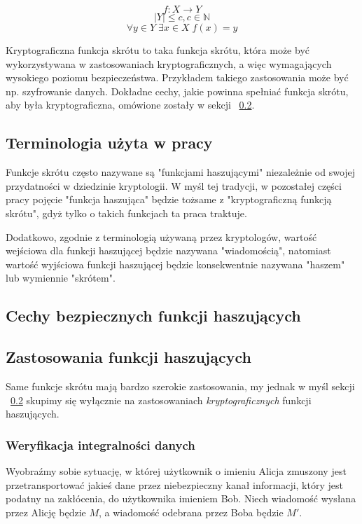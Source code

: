 \documentclass[12pt,a4paper,twoside]{article}
\begin{document}
$$ f \colon X \to Y $$
$$ |Y| \leq c, c \in \mathbb{N} $$
$$ \forall{y \in Y} \; \exists{x \in X} \; f(x)=y$$

Kryptograficzna funkcja skrótu to taka funkcja skrótu, która może być
wykorzystywana w zastosowaniach kryptograficznych, a więc wymagających
wysokiego poziomu bezpieczeństwa. Przykładem takiego zastosowania może być np.
szyfrowanie danych. Dokładne cechy, jakie powinna spełniać funkcja skrótu, aby
była kryptograficzna, omówione zostały w sekcji
~\ref{sec:secure_hash_attributes}.


\subsection{Terminologia użyta w pracy}

Funkcje skrótu często nazywane są "funkcjami haszującymi" niezależnie od swojej
przydatności w dziedzinie kryptologii. W myśl tej tradycji, w pozostałej części
pracy pojęcie "funkcja haszująca" będzie tożsame z "kryptograficzną funkcją
skrótu", gdyż tylko o takich funkcjach ta praca traktuje.

Dodatkowo, zgodnie z terminologią używaną przez kryptologów, wartość wejściowa
dla funkcji haszującej będzie nazywana "wiadomością", natomiast wartość
wyjściowa funkcji haszującej będzie konsekwentnie nazywana "haszem" lub
wymiennie "skrótem".



\subsection{Cechy bezpiecznych funkcji haszujących}
\label{sec:secure_hash_attributes}



\subsection{Zastosowania funkcji haszujących}

Same funkcje skrótu mają bardzo szerokie zastosowania, my jednak w myśl sekcji
~\ref{sec:secure_hash_attributes} skupimy się wyłącznie na zastosowaniach
\emph{kryptograficznych} funkcji haszujących.

\subsubsection{Weryfikacja integralności danych}

Wyobraźmy sobie sytuację, w której użytkownik o imieniu Alicja zmuszony jest
przetransportować jakieś dane przez niebezpieczny kanał informacji, który jest
podatny na zakłócenia, do użytkownika imieniem Bob. Niech wiadomość wysłana
przez Alicję będzie $M$, a wiadomość odebrana przez Boba będzie $M'$.
\end{document}
